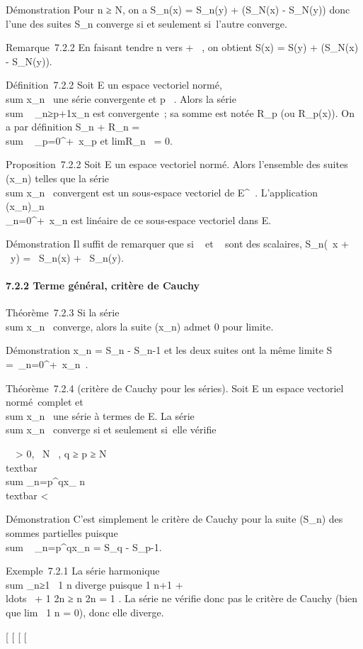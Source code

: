 \documentclass[]{article}
\begin{document}
Démonstration Pour n ≥ N, on a S\_n(x) = S\_n(y) +
(S\_N(x) - S\_N(y)) donc l'une des suites S\_n
converge si et seulement si~l'autre converge.

Remarque~7.2.2 En faisant tendre n vers + \infty~, on obtient S(x) = S(y) +
(S\_N(x) - S\_N(y)).

Définition~7.2.2 Soit E un espace vectoriel normé,
\\sum  x\_n~ une
série convergente et p \in {}~. Alors la série
\\sum ~
\_n≥p+1x\_n est convergente~; sa somme est notée
R\_p (ou R\_p(x)). On a par définition S\_n +
R\_n = \\sum ~
\_p=0^+\infty~x\_p et
limR\_n~ = 0.

Proposition~7.2.2 Soit E un espace vectoriel normé. Alors l'ensemble des
suites (x\_n) telles que la série
\\sum  x\_n~
convergent est un sous-espace vectoriel de E^~. L'application
(x\_n)\_n\in{}~\mapsto~\\\sum
 \_n=0^+\infty~x\_n est linéaire de ce sous-espace
vectoriel dans E.

Démonstration Il suffit de remarquer que si \alpha~ et \beta~ sont des scalaires,
S\_n(\alpha~x + \beta~y) = \alpha~S\_n(x) + \beta~S\_n(y).

\paragraph{7.2.2 Terme général, critère de Cauchy}

Théorème~7.2.3 Si la série
\\sum  x\_n~
converge, alors la suite (x\_n) admet 0 pour limite.

Démonstration x\_n = S\_n - S\_n-1 et les deux
suites ont la même limite S =\
\sum  \_n=0^+\infty~x\_n~.

Théorème~7.2.4 (critère de Cauchy pour les séries). Soit E un espace
vectoriel normé~complet et
\\sum  x\_n~ une
série à termes de E. La série
\\sum  x\_n~
converge si et seulement si~elle vérifie

\forall~~\epsilon \textgreater{} 0,
\exists~N \in {}~, q ≥ p ≥ N
\rigtharrow~\\textbar{}\\sum
\_n=p^qx\_ n\\textbar{}
\textless{} \epsilon

Démonstration C'est simplement le critère de Cauchy pour la suite
(S\_n) des sommes partielles puisque
\\sum ~
\_n=p^qx\_n = S\_q - S\_p-1.

Exemple~7.2.1 La série harmonique
\\sum  \_n≥1~ 1
\over n diverge puisque  1 \over n+1
+ \\ldots~ + 1
n ≥ n  \over 2n = 1
\over 2 . La série ne vérifie donc pas le critère de
Cauchy (bien que lim~ 1 \over
n = 0), donc elle diverge.

{[}
{[}
{[}
{[}
\end{document}
